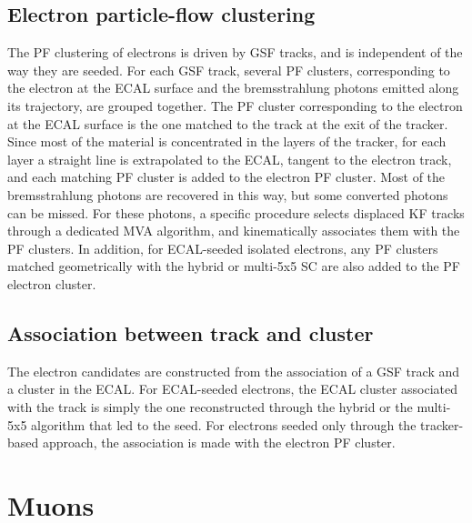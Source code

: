 \subsection{Electron particle-flow clustering}
The PF clustering of electrons is driven by GSF tracks, and is independent of the way they are seeded. For each GSF track, several PF clusters, corresponding to the electron at the ECAL surface and the bremsstrahlung photons emitted along its trajectory, are grouped together. The PF cluster corresponding to the electron at the ECAL surface is the one matched to the track at the exit of the tracker. Since most of the material is concentrated in the layers of the tracker, for each layer a straight line is extrapolated to the ECAL, tangent to the electron track, and each matching PF cluster is added to the electron PF cluster. Most of the bremsstrahlung photons are recovered in this way, but some converted photons can be missed. For these photons, a specific procedure selects displaced KF tracks through a dedicated MVA algorithm, and kinematically associates them with the PF clusters. In addition, for ECAL-seeded isolated electrons, any PF clusters matched geometrically with the hybrid or multi-5x5 SC are also added to the PF electron cluster.
\subsection{Association between track and cluster}
The electron candidates are constructed from the association of a GSF track and a cluster in the ECAL. For ECAL-seeded electrons, the ECAL cluster associated with the track is simply the one reconstructed through the hybrid or the multi-5x5 algorithm that led to the seed. For electrons seeded only through the tracker-based approach, the association is made with the electron PF cluster.

\section{Muons}
